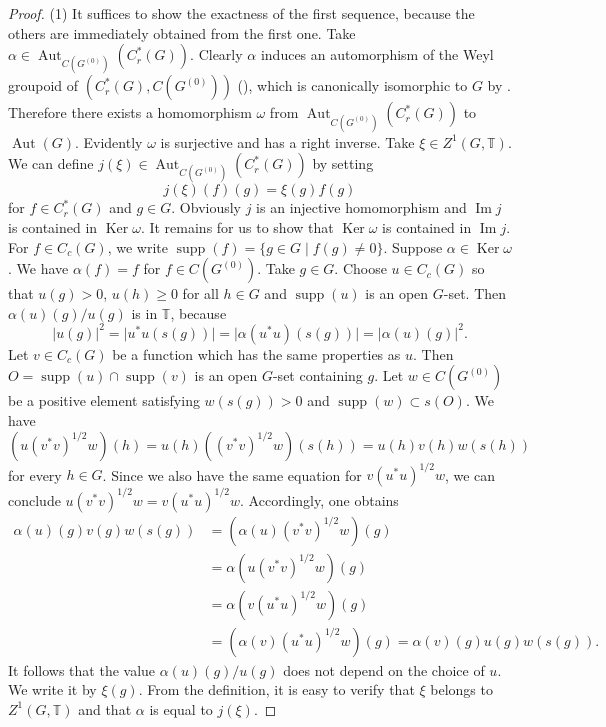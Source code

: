 \documentclass[11pt]{article}
\theoremstyle{definition}
\renewcommand{\ker}{\operatorname{Ker}}
\newcommand{\Aut}{\operatorname{Aut}}
\newcommand{\Ima}{\operatorname{Im}}
\newcommand{\supp}{\operatorname{supp}}
\newcommand{\T}{\mathbb{T}}
\begin{document}
\begin{proof}
(1)
It suffices to show the exactness of the first sequence, 
because the others are immediately obtained from the first one. 
Take $\alpha\in\Aut_{C(G^{(0)})}(C^*_r(G))$. 
Clearly $\alpha$ induces an automorphism of the Weyl groupoid of 
$(C^*_r(G),C(G^{(0)}))$ (\cite[Definition 4.2]{R3}), 
which is canonically isomorphic to $G$ by \cite[Proposition 4.11]{R3}. 
Therefore there exists a homomorphism $\omega$ 
from $\Aut_{C(G^{(0)})}(C^*_r(G))$ to $\Aut(G)$. 
Evidently $\omega$ is surjective and has a right inverse. 
Take $\xi\in Z^1(G,\T)$. 
We can define $j(\xi)\in\Aut_{C(G^{(0)})}(C^*_r(G))$ by setting 
\[
j(\xi)(f)(g)=\xi(g)f(g)
\]
for $f\in C^*_r(G)$ and $g\in G$. 
Obviously $j$ is an injective homomorphism and 
$\Ima j$ is contained in $\ker\omega$. 
It remains for us to show that $\ker\omega$ is contained in $\Ima j$. 
For $f\in C_c(G)$, we write $\supp(f)=\{g\in G\mid f(g)\neq0\}$. 
Suppose $\alpha\in\ker\omega$. 
We have $\alpha(f)=f$ for $f\in C(G^{(0)})$. 
Take $g\in G$. 
Choose $u\in C_c(G)$ so that $u(g)>0$, $u(h)\geq0$ for all $h\in G$ and 
$\supp(u)$ is an open $G$-set. 
Then $\alpha(u)(g)/u(g)$ is in $\T$, because
\[
\lvert u(g)\rvert^2=\lvert u^*u(s(g))\rvert
=\lvert \alpha(u^*u)(s(g))\rvert=\lvert \alpha(u)(g)\rvert^2. 
\]
Let $v\in C_c(G)$ be a function which has the same properties as $u$. 
Then $O=\supp(u)\cap\supp(v)$ is an open $G$-set containing $g$. 
Let $w\in C(G^{(0)})$ be a positive element 
satisfying $w(s(g))>0$ and $\supp(w)\subset s(O)$. 
We have 
\[
(u(v^*v)^{1/2}w)(h)=u(h)((v^*v)^{1/2}w)(s(h))=u(h)v(h)w(s(h))
\]
for every $h\in G$. 
Since we also have the same equation for $v(u^*u)^{1/2}w$, 
we can conclude $u(v^*v)^{1/2}w=v(u^*u)^{1/2}w$. 
Accordingly, one obtains 
\begin{align*}
\alpha(u)(g)v(g)w(s(g))
&=(\alpha(u)(v^*v)^{1/2}w)(g) \\
&=\alpha(u(v^*v)^{1/2}w)(g) \\
&=\alpha(v(u^*u)^{1/2}w)(g) \\
&=(\alpha(v)(u^*u)^{1/2}w)(g)=\alpha(v)(g)u(g)w(s(g)). 
\end{align*}
It follows that 
the value $\alpha(u)(g)/u(g)$ does not depend on the choice of $u$. 
We write it by $\xi(g)$. 
From the definition, 
it is easy to verify that $\xi$ belongs to $Z^1(G,\T)$ and 
that $\alpha$ is equal to $j(\xi)$. 


\end{proof}
\end{document}
